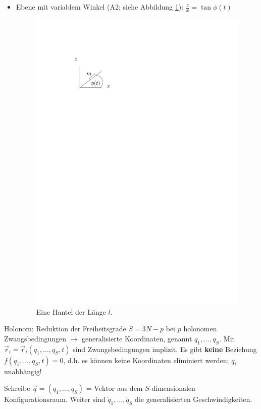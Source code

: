 \begin{itemize}
	\item Ebene mit variablem Winkel (A2; siehe Abbildung \ref{fig:ch1_schiefeebene}): $\frac{z}{x} = \tan \phi(t)$
	\begin{figure}
		\centering
		\includegraphics{figures/ch1/schiefeebene}
		\caption{Eine Hantel der Länge $l$.}
		\label{fig:ch1_schiefeebene}
	\end{figure}
\end{itemize}

Holonom: Reduktion der Freiheitsgrade $S = 3N - p$ bei $p$ holonomen Zwangsbedingungen $\rightarrow$ generalisierte Koordinaten, genannt $q_1, \dots, q_S$. Mit $\vec{r}_i = \vec{r}_i(q_1, \dots, q_S, t)$ sind Zwangsbedingungen implizit. Es gibt \textbf{keine} Beziehung $f(q_1, \dots, q_S, t) = 0$, d.h. es können keine Koordinaten eliminiert werden; $q_i$ unabhängig!

Schreibe $\vec{q} = (q_1, \dots, q_S)$ = Vektor aus dem $S$-dimensionalen Konfigurationsraum. Weiter sind $\dot{q}_1, \dots, \dot{q}_S$ die generalisierten Geschwindigkeiten.

